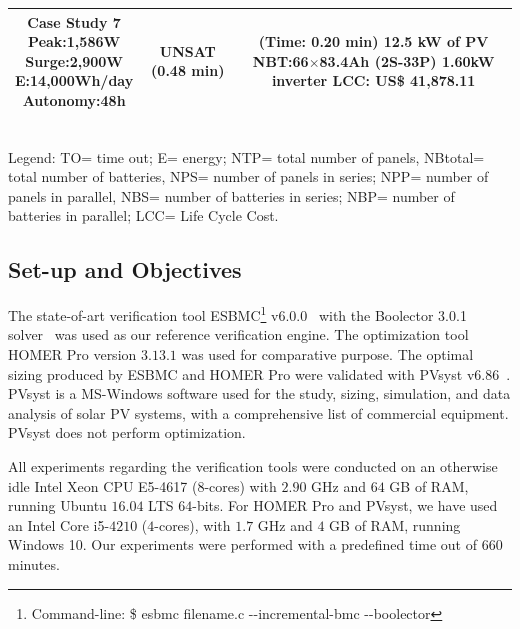 \documentclass[journal]{IEEEtran}
\begin{document}
\begin{table}
\begin{scriptsize}
\begin{tabular}{c|c|c}
\hline
\makecell{\textbf{Case Study 7}\\Peak:1,586W\\Surge:2,900W\\E:14,000Wh/day\\Autonomy:48h} & UNSAT (0.48 min) & \makecell{(Time: 0.20 min)\\12.5 kW of PV\\NBT:66$\times$83.4Ah (2S-33P)\\1.60kW inverter\\LCC: US\$ 41,878.11} \\
\hline
\hline
\end{tabular}
\\Legend: TO= time out; E= energy; NTP= total number of panels, NBtotal= total number of batteries, NPS= number of panels in series; NPP= number of panels in parallel, NBS= number of batteries in series; NBP= number of batteries in parallel; LCC= Life Cycle Cost.
\end{scriptsize}
\end{table}

\subsection{Set-up and Objectives} 

The state-of-art verification tool ESBMC\footnote{Command-line: \$ esbmc filename.c -\phantom{}-incremental-bmc -\phantom{}-boolector} v6.0.0~\cite{esbmc2018} with the Boolector 3.0.1 solver~\cite{Brummayer} was used as our reference verification engine. The optimization tool HOMER Pro version $3.13.1$ was used for comparative purpose. The optimal sizing produced by ESBMC and HOMER Pro were validated with PVsyst v$6.86$~\cite{PVsyst}. PVsyst is a MS-Windows software used for the study, sizing, simulation, and data analysis of solar PV systems, with a comprehensive list of commercial equipment. PVsyst does not perform optimization. %

All experiments regarding the verification tools were conducted on an otherwise idle Intel Xeon CPU E5-4617 ($8$-cores) with $2.90$ GHz and $64$ GB of RAM, running Ubuntu $16.04$ LTS $64$-bits. For HOMER Pro and PVsyst, we have used an Intel Core i5-$4210$ ($4$-cores), with $1.7$ GHz and $4$ GB of RAM, running Windows 10. Our experiments were performed with a predefined time out of $660$ minutes.
\end{document}
